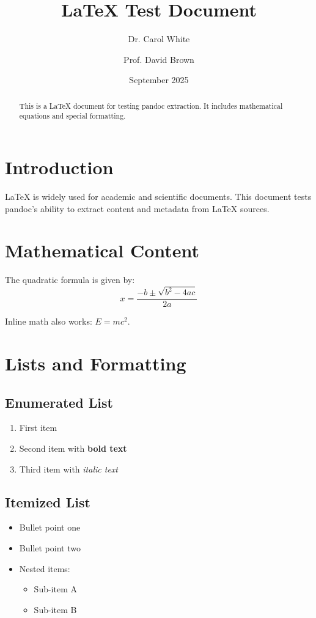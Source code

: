 \documentclass{article}
\title{LaTeX Test Document}
\author{Dr. Carol White \and Prof. David Brown}
\date{September 2025}
\begin{document}
\maketitle

\begin{abstract}
This is a LaTeX document for testing pandoc extraction.
It includes mathematical equations and special formatting.
\end{abstract}

\section{Introduction}

LaTeX is widely used for academic and scientific documents.
This document tests pandoc's ability to extract content and metadata from LaTeX sources.

\section{Mathematical Content}

The quadratic formula is given by:
\begin{equation}
x = \frac{-b \pm \sqrt{b^2-4ac}}{2a}
\end{equation}

Inline math also works: $E = mc^2$.

\section{Lists and Formatting}

\subsection{Enumerated List}
\begin{enumerate}
    \item First item
    \item Second item with \textbf{bold text}
    \item Third item with \textit{italic text}
\end{enumerate}

\subsection{Itemized List}
\begin{itemize}
    \item Bullet point one
    \item Bullet point two
    \item Nested items:
    \begin{itemize}
        \item Sub-item A
        \item Sub-item B
    \end{itemize}
\end{itemize}
\end{document}
